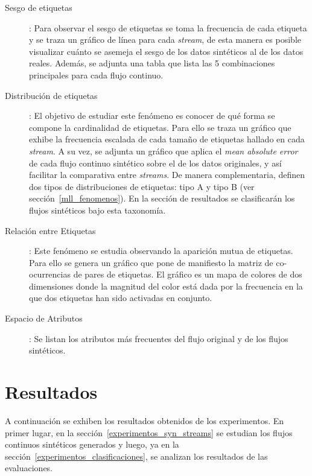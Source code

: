 \begin{description}

	\item[Sesgo de etiquetas]: Para observar el sesgo de etiquetas se toma la frecuencia de
	      cada etiqueta y se traza un gráfico de línea para cada \textit{stream}, de esta
	      manera es posible visualizar cuánto se asemeja el sesgo de los datos sintéticos
	      al de los datos reales. Además, se adjunta una tabla que lista las 5
	      combinaciones principales para cada flujo continuo.

	\item[Distribución de etiquetas]: El objetivo de estudiar este fenómeno es
	      conocer de qué forma se compone la cardinalidad de etiquetas. Para ello
	      se traza un gráfico que exhibe la frecuencia escalada de cada tamaño de
	      etiquetas hallado en cada \textit{stream}. A su vez, se adjunta un
	      gráfico que aplica el \textit{mean absolute error} de cada flujo
	      continuo sintético sobre el de los datos originales, y así facilitar la
	      comparativa entre \textit{streams}. De manera complementaria,
	      \citeauthor{read_generating_2009} definen dos tipos de distribuciones de
	      etiquetas: tipo A y tipo B (ver sección~\ref{mll_fenomenos}). En la
	      sección de resultados se clasificarán los flujos sintéticos bajo esta
	      taxonomía.

	\item[Relación entre Etiquetas]: Este fenómeno se estudia observando la
	      aparición mutua de etiquetas. Para ello se genera un gráfico que pone de
	      manifiesto la matriz de co-ocurrencias de pares de etiquetas. El gráfico
	      es un mapa de colores de dos dimensiones donde la magnitud del color
	      está dada por la frecuencia en la que dos etiquetas han sido activadas
	      en conjunto.

	\item[Espacio de Atributos]: Se listan los atributos más frecuentes del
	      flujo original y de los flujos sintéticos.

\end{description}


\section{Resultados}

A continuación se exhiben los resultados obtenidos de los experimentos. En
primer lugar, en la sección~\ref{experimentos_syn_streams} se estudian los
flujos continuos sintéticos generados y luego, ya en la
sección~\ref{experimentos_clasificaciones}, se analizan los resultados de las
evaluaciones.

